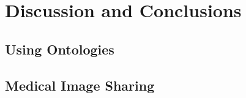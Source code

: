 
\chapter{Discussion and Conclusions} %

\label{Chapter6} %



\section{Using Ontologies}


\section{Medical Image Sharing}

